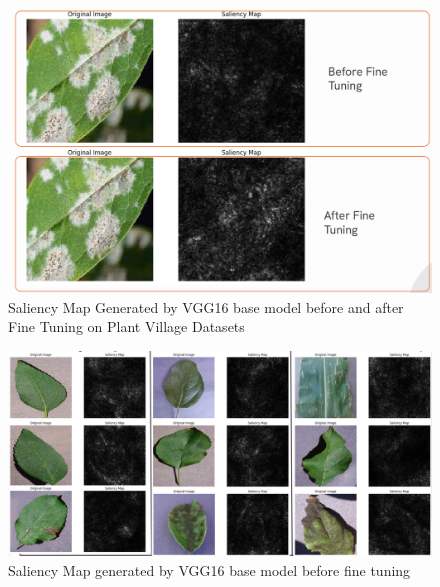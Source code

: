 \begin{figure}
    \centering
    \includegraphics[width=1\linewidth]{graphics//chapter7/vgg smap1.png}
    \caption{Saliency Map Generated by VGG16 base model before and after Fine Tuning on Plant Village Datasets}
    \label{fig:smap-2}
\end{figure}


\begin{figure}
    \centering
    \includegraphics[width=1\textheight, angle=90, origin=c]{graphics//chapter7/vgg smap2.png}
    \caption{Saliency Map generated by VGG16 base model before fine tuning}
    \label{fig:smap-3}
\end{figure}






